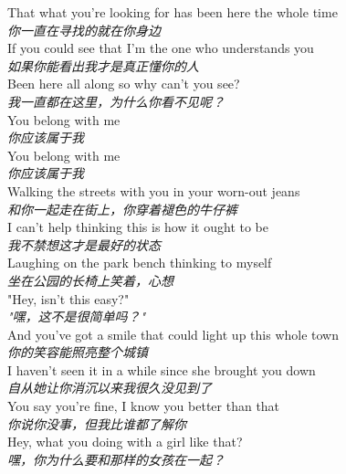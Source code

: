 \begin{spacing}{1.5}
\begin{flushleft}
That what you're looking for has been here the whole time\\
\textit{你一直在寻找的就在你身边}\\[0.5em]

If you could see that I'm the one who understands you\\
\textit{如果你能看出我才是真正懂你的人}\\[0.5em]

Been here all along so why can't you see?\\
\textit{我一直都在这里，为什么你看不见呢？}\\[0.5em]

You belong with me\\
\textit{你应该属于我}\\[0.5em]

You belong with me\\
\textit{你应该属于我}\\[0.5em]

Walking the streets with you in your worn-out jeans\\
\textit{和你一起走在街上，你穿着褪色的牛仔裤}\\[0.5em]

I can't help thinking this is how it ought to be\\
\textit{我不禁想这才是最好的状态}\\[0.5em]

Laughing on the park bench thinking to myself\\
\textit{坐在公园的长椅上笑着，心想}\\[0.5em]

"Hey, isn't this easy?"\\
\textit{"嘿，这不是很简单吗？"}\\[0.5em]

And you've got a smile that could light up this whole town\\
\textit{你的笑容能照亮整个城镇}\\[0.5em]

I haven't seen it in a while since she brought you down\\
\textit{自从她让你消沉以来我很久没见到了}\\[0.5em]

You say you're fine, I know you better than that\\
\textit{你说你没事，但我比谁都了解你}\\[0.5em]

Hey, what you doing with a girl like that?\\
\textit{嘿，你为什么要和那样的女孩在一起？}\\[0.5em]


\end{flushleft}
\end{spacing}
